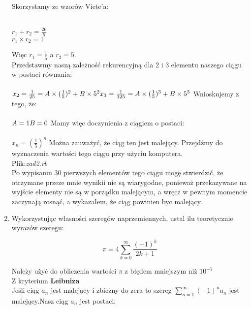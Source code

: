 \documentclass[fleqn]{article}
\begin{document}
\begin{enumerate}
\begin{center}
   \end{center}
   Skorzystamy ze wzorów Viete'a:\\ \\
   \begin{center}
   $r_{1}+r_{2}=\frac{26}{5}$\\
   $r_{1}\times r_{2}=1$\\  
   \end{center}
    Więc $r_{1} = \frac{1}{5}$ a $r_{2} = 5$.\\Przedstawmy naszą zależność rekurencyjną dla 2 i 3 elementu naszego ciągu w postaci równania:\\ \\
    $
    x_{2} = \frac{1}{25} = A \times (\frac{1}{5})^{2} + B \times 5^{2} \\ \\
    x_{3} = \frac{1}{125} = A \times (\frac{1}{5})^{3} + B \times 5^{3}\\
    $
    Wnioskujemy z tego, że:\\ \\
    $
    A = 1 \\ \\
    B = 0 \\ \\
    $
    Mamy więc doczynienia z ciągiem o postaci:\\ \\
    $
    x_{n} =(\frac{1}{5})^{n}
    $
    Można zauważyć, że ciąg ten jest malejący. Przejdźmy do wyznaczenia wartości tego ciągu przy użyciu komputera.\\
    Plik:\emph{zad2.rb}\\
   Po wypisaniu 30 pierwszych elementów tego ciągu mogę stwierdzić, że otrzymane przeze mnie wynikii nie są wiarygodne, ponieważ przekazywane                     na wyjście elementy nie są w porządku malejącym, a wręcz w pewnym momencie zaczynają rosnąć, a wykazałem, że ciąg powinien byc malejący.
   \item Wykorzystując własności szeregów naprzemiennych, ustal ilu teoretycznie wyrazów szeregu: 
   \begin{center}
  \[\pi = 4\sum_{k=0}^\infty\frac{(-1)^{k}}{2k+1}\]
   \end{center}
   Należy użyć do obliczenia wartości $\pi$ z błędem mniejszym niż $10^{-7}$\\
   Z kryterium \textbf{Leibniza}\\
   Jeśli ciąg $a_{n}$ jest malejący i zbieżny do zera to szereg $\sum_{n=1}^\infty(-1)^{n}a_{n}$ jest malejący.Nasz ciąg $a_{n}$ jest postaci:

\end{enumerate}
\end{document}
